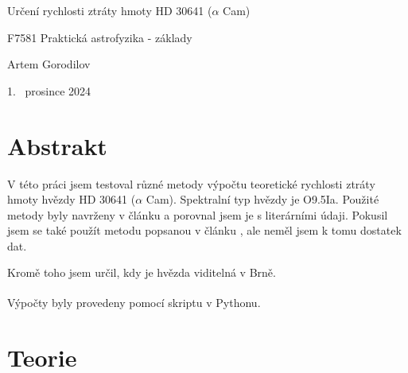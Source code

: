 \documentclass[a4paper,11pt]{article}
\begin{document}
\noindent\hrulefill 
\begin{center}
\bigskip
\huge Určení rychlosti ztráty hmoty HD 30641 ($\alpha$ Cam)
\vspace{0.5cm}
\par \large F7581 Praktická astrofyzika - základy
\par \large Artem Gorodilov
\vspace{0.5cm}
\par \large 1. ~prosince 2024
\bigskip
\end{center}
\noindent\hrulefill 
\bigskip

\vskip10pt
    \begin{minipage}[t]{0.5\textwidth} 
        \section{Abstrakt}    
            V této práci jsem testoval různé metody výpočtu teoretické rychlosti ztráty hmoty hvězdy HD 30641 ($\alpha$ Cam). Spektralní typ hvězdy je O9.5Ia. Použité metody byly navrženy v článku \cite{2000A&A...362..295V} a porovnal jsem je s literárními údaji. Pokusil jsem se také použít metodu popsanou v článku \cite{2001A&A...369..574V}, ale neměl jsem k tomu dostatek dat.  
            \par Kromě toho jsem určil, kdy je hvězda viditelná v Brně.
            \par Výpočty byly provedeny pomocí skriptu v Pythonu\textsuperscript{\cite{github}}.

        \section{Teorie}

\end{minipage}
\end{document}
